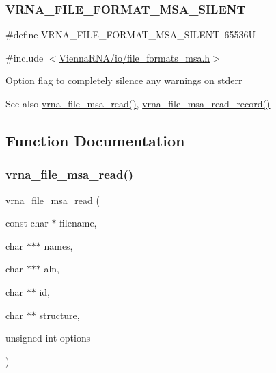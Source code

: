 \subsubsection{\texorpdfstring{V\+R\+N\+A\+\_\+\+F\+I\+L\+E\+\_\+\+F\+O\+R\+M\+A\+T\+\_\+\+M\+S\+A\+\_\+\+S\+I\+L\+E\+NT}{VRNA\_FILE\_FORMAT\_MSA\_SILENT}}
{\footnotesize\ttfamily \#define V\+R\+N\+A\+\_\+\+F\+I\+L\+E\+\_\+\+F\+O\+R\+M\+A\+T\+\_\+\+M\+S\+A\+\_\+\+S\+I\+L\+E\+NT~65536U}



{\ttfamily \#include $<$\hyperlink{io_2file__formats__msa_8h}{Vienna\+R\+N\+A/io/file\+\_\+formats\+\_\+msa.\+h}$>$}



Option flag to completely silence any warnings on {\ttfamily stderr} 

\begin{DoxySeeAlso}{See also}
\hyperlink{group__file__formats__msa_ga08a01c40ac5f5e0e04e9ae2258c99aa6}{vrna\+\_\+file\+\_\+msa\+\_\+read()}, \hyperlink{group__file__formats__msa_ga59204cd1daa4927f5127cc65a2886efd}{vrna\+\_\+file\+\_\+msa\+\_\+read\+\_\+record()} 
\end{DoxySeeAlso}


\subsection{Function Documentation}
\mbox{\label{group__file__formats__msa_ga08a01c40ac5f5e0e04e9ae2258c99aa6}} 
\subsubsection{\texorpdfstring{vrna\+\_\+file\+\_\+msa\+\_\+read()}{vrna\_file\_msa\_read()}}
{\footnotesize\ttfamily vrna\+\_\+file\+\_\+msa\+\_\+read (\begin{DoxyParamCaption}\item[{const char $\ast$}]{filename,  }\item[{char $\ast$$\ast$$\ast$}]{names,  }\item[{char $\ast$$\ast$$\ast$}]{aln,  }\item[{char $\ast$$\ast$}]{id,  }\item[{char $\ast$$\ast$}]{structure,  }\item[{unsigned int}]{options }\end{DoxyParamCaption})}



